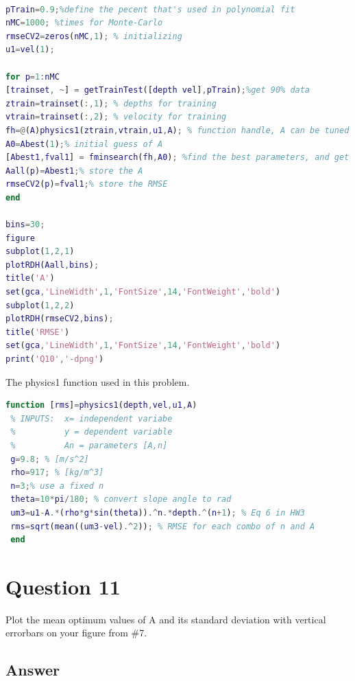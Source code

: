 \documentclass[
	12pt, %
]{fphw}
\begin{document}
  \begin{lstlisting}[language=Matlab,escapeinside=``]

pTrain=0.9;%define the pecent that's used in polynomial fit
nMC=1000; %times for Monte-Carlo
rmseCV2=zeros(nMC,1); % initializing
u1=vel(1);

for p=1:nMC
[trainset, ~] = getTrainTest([depth vel],pTrain);%get 90% data
ztrain=trainset(:,1); % depths for training
vtrain=trainset(:,2); % velocity for training
fh=@(A)physics1(ztrain,vtrain,u1,A); % function handle, A can be tuned to data in v,z
A0=Abest(1);% initial guess of A
[Abest1,fval1] = fminsearch(fh,A0); %find the best parameters, and get the error
Aall(p)=Abest1;% store the A
rmseCV2(p)=fval1;% store the RMSE
end

bins=30;
figure
subplot(1,2,1)
plotRDH(Aall,bins);
title('A')
set(gca,'LineWidth',1,'FontSize',14,'FontWeight','bold')
subplot(1,2,2)
plotRDH(rmseCV2,bins);
title('RMSE')
set(gca,'LineWidth',1,'FontSize',14,'FontWeight','bold')
print('Q10','-dpng')

 \end{lstlisting}
 
 The physics1 function used in this problem.
  \begin{lstlisting}[language=Matlab,escapeinside=``]
 function [rms]=physics1(depth,vel,u1,A)
 % INPUTS:  x= independent variabe
 %          y = dependent variable
 %          An = parameters [A,n]
 g=9.8; % [m/s^2]
 rho=917; % [kg/m^3]
 n=3;% use a fixed n
 theta=10*pi/180; % convert slope angle to rad
 um3=u1-A.*(rho*g*sin(theta)).^n.*depth.^(n+1); % Eq 6 in HW3
 rms=sqrt(mean((um3-vel).^2)); % RMSE for each combo of n and A
 end
 \end{lstlisting}
 
 
\clearpage

 \section*{Question 11 }

\begin{problem}
Plot the mean optimum values of A and its standard deviation with vertical errorbars on your figure from \#7.	
\end{problem}

\subsection*{Answer}
\end{document}
